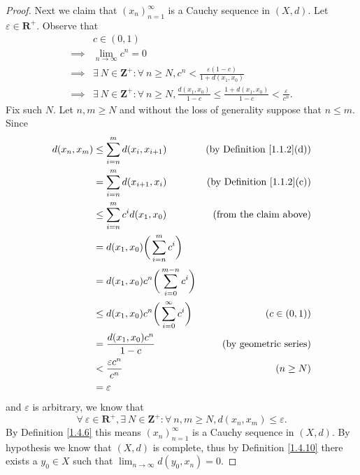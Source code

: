 \begin{proof}
    Next we claim that \((x_n)_{n = 1}^\infty\) is a Cauchy sequence in \((X, d)\).
    Let \(\varepsilon \in \mathbf{R}^+\).
    Observe that
    \begin{align*}
                 & c \in (0, 1)                                                                                                                             \\
        \implies & \lim_{n \to \infty} c^n = 0                                                                                                              \\
        \implies & \exists\ N \in \mathbf{Z}^+ : \forall\ n \geq N, c^n < \frac{\varepsilon (1 - c)}{1 + d(x_1, x_0)}                                       \\
        \implies & \exists\ N \in \mathbf{Z}^+ : \forall\ n \geq N, \frac{d(x_1, x_0)}{1 - c} \leq \frac{1 + d(x_1, x_0)}{1 - c} < \frac{\varepsilon}{c^n}.
    \end{align*}
    Fix such \(N\).
    Let \(n, m \geq N\) and without the loss of generality suppose that \(n \leq m\).
    Since
    \begin{align*}
        d(x_n, x_m) & \leq \sum_{i = n}^m d(x_i, x_{i + 1})                    & \text{(by Definition \ref{1.1.2}(d))} \\
                    & = \sum_{i = n}^m d(x_{i + 1}, x_i)                       & \text{(by Definition \ref{1.1.2}(c))} \\
                    & \leq \sum_{i = n}^m c^i d(x_1, x_0)                      & \text{(from the claim above)}         \\
                    & = d(x_1, x_0) \bigg(\sum_{i = n}^m c^i\bigg)                                                     \\
                    & = d(x_1, x_0) c^n \bigg(\sum_{i = 0}^{m - n} c^i\bigg)                                           \\
                    & \leq d(x_1, x_0) c^n \bigg(\sum_{i = 0}^\infty c^i\bigg) & (c \in (0, 1))                        \\
                    & = \frac{d(x_1, x_0) c^n}{1 - c}                          & \text{(by geometric series)}          \\
                    & < \frac{\varepsilon c^n}{c^n}                            & (n \geq N)                            \\
                    & = \varepsilon
    \end{align*}
    and \(\varepsilon\) is arbitrary, we know that
    \[
        \forall\ \varepsilon \in \mathbf{R}^+, \exists\ N \in \mathbf{Z}^+ : \forall\ n, m \geq N, d(x_n, x_m) \leq \varepsilon.
    \]
    By Definition \ref{1.4.6} this means \((x_n)_{n = 1}^\infty\) is a Cauchy sequence in \((X, d)\).
    By hypothesis we know that \((X, d)\) is complete, thus by Definition \ref{1.4.10} there exists a \(y_0 \in X\) such that \(\lim_{n \to \infty} d(y_0, x_n) = 0\).


\end{proof}
